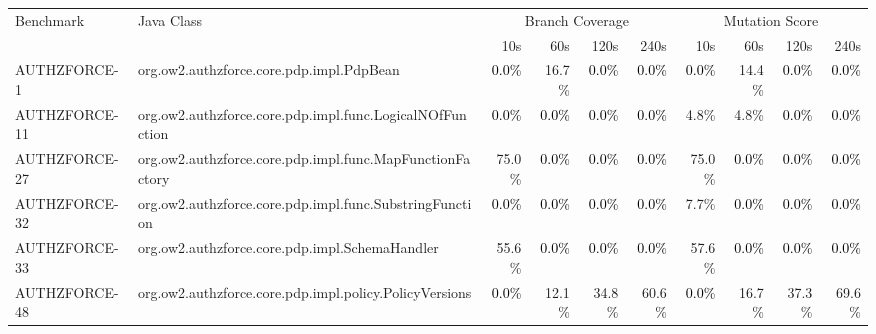 \begin{tabular}{ ll rrrr rrrr}\toprule 
 \multirow{2}{1in}{Benchmark} & \multirow{2}{1in}{Java Class} &  \multicolumn{4}{c}{Branch Coverage} &  \multicolumn{4}{c}{Mutation Score}\\\cmidrule(lr){3-6}\cmidrule(lr){7-10} 
 & & 10s & 60s & 120s & 240s & 10s & 60s & 120s & 240s \\ 
\midrule 
AUTHZFORCE-1  &  org.ow2.authzforce.core.pdp.impl.PdpBean & \cellcolor{light-gray} \textcolor{black}{0.0\%} & 16.7\% & \cellcolor{light-gray} \textcolor{black}{0.0\%} & \cellcolor{light-gray} \textcolor{black}{0.0\%} & \cellcolor{light-gray} \textcolor{black}{0.0\%} & 14.4\% & \cellcolor{light-gray} \textcolor{black}{0.0\%} & \cellcolor{light-gray} \textcolor{black}{0.0\%}\\ 
AUTHZFORCE-11  &  org.ow2.authzforce.core.pdp.impl.func.LogicalNOfFunction & \cellcolor{light-gray} \textcolor{black}{0.0\%} & \cellcolor{light-gray} \textcolor{black}{0.0\%} & \cellcolor{light-gray} \textcolor{black}{0.0\%} & \cellcolor{light-gray} \textcolor{black}{0.0\%} & 4.8\% & 4.8\% & \cellcolor{light-gray} \textcolor{black}{0.0\%} & \cellcolor{light-gray} \textcolor{black}{0.0\%}\\ 
AUTHZFORCE-27  &  org.ow2.authzforce.core.pdp.impl.func.MapFunctionFactory & 75.0\% & \cellcolor{light-gray} \textcolor{black}{0.0\%} & \cellcolor{light-gray} \textcolor{black}{0.0\%} & \cellcolor{light-gray} \textcolor{black}{0.0\%} & 75.0\% & \cellcolor{light-gray} \textcolor{black}{0.0\%} & \cellcolor{light-gray} \textcolor{black}{0.0\%} & \cellcolor{light-gray} \textcolor{black}{0.0\%}\\ 
AUTHZFORCE-32  &  org.ow2.authzforce.core.pdp.impl.func.SubstringFunction & \cellcolor{light-gray} \textcolor{black}{0.0\%} & \cellcolor{light-gray} \textcolor{black}{0.0\%} & \cellcolor{light-gray} \textcolor{black}{0.0\%} & \cellcolor{light-gray} \textcolor{black}{0.0\%} & 7.7\% & \cellcolor{light-gray} \textcolor{black}{0.0\%} & \cellcolor{light-gray} \textcolor{black}{0.0\%} & \cellcolor{light-gray} \textcolor{black}{0.0\%}\\ 
AUTHZFORCE-33  &  org.ow2.authzforce.core.pdp.impl.SchemaHandler & 55.6\% & \cellcolor{light-gray} \textcolor{black}{0.0\%} & \cellcolor{light-gray} \textcolor{black}{0.0\%} & \cellcolor{light-gray} \textcolor{black}{0.0\%} & 57.6\% & \cellcolor{light-gray} \textcolor{black}{0.0\%} & \cellcolor{light-gray} \textcolor{black}{0.0\%} & \cellcolor{light-gray} \textcolor{black}{0.0\%}\\ 
AUTHZFORCE-48  &  org.ow2.authzforce.core.pdp.impl.policy.PolicyVersions & \cellcolor{light-gray} \textcolor{black}{0.0\%} & 12.1\% & 34.8\% & 60.6\% & \cellcolor{light-gray} \textcolor{black}{0.0\%} & 16.7\% & 37.3\% & 69.6\%\\ 

\end{tabular}
